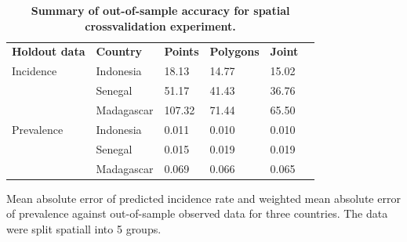 \documentclass[10pt,letterpaper]{article}
\newlength\savedwidth
\newcommand\thickhline{\noalign{\global\savedwidth\arrayrulewidth\global\arrayrulewidth 2pt}%
\hline
\noalign{\global\arrayrulewidth\savedwidth}}
\begin{document}
\begin{table}[!ht]
\begin{adjustwidth}{-2.25in}{0in} %
\centering
\caption{
{\bf Summary of out-of-sample accuracy for spatial crossvalidation experiment.}}
\begin{tabular}{llllll}
\hline
{\bf Holdout data} & {\bf Country} &  {\bf Points} & {\bf Polygons} & {\bf Joint} \\
\thickhline 
Incidence & Indonesia &  18.13 &  14.77 &   15.02\\
& Senegal &  51.17 &  41.43 &   36.76\\
& Madagascar & 107.32 &  71.44 &   65.50\vspace{3mm}\\
Prevalence & Indonesia & 0.011 & 0.010 &  0.010\\
& Senegal & 0.015 & 0.019 &  0.019\\
& Madagascar & 0.069 & 0.066 &  0.065\\
\end{tabular}
\begin{flushleft}
Mean absolute error of predicted incidence rate and weighted mean absolute error of prevalence against out-of-sample observed data for three countries.
The data were split spatiall into 5 groups.
\end{flushleft}
\label{table2}
\end{adjustwidth}
\end{table}
\end{document}
